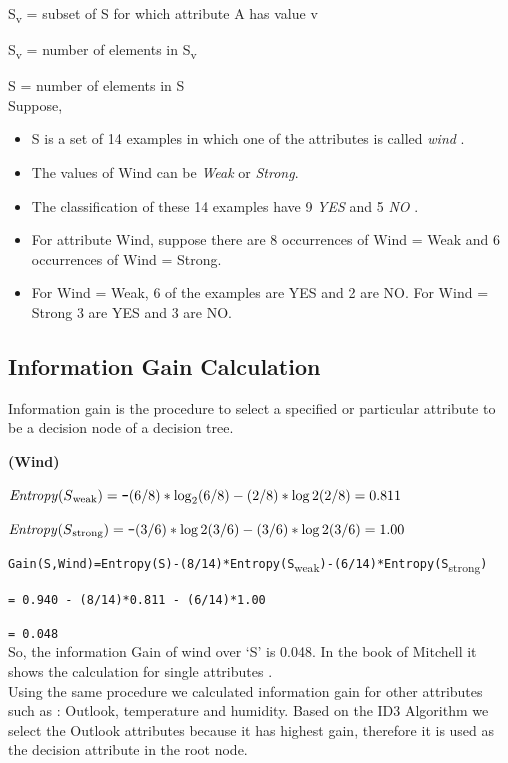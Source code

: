 \documentclass{report}
\newcommand\textstyleTeletype[1]{\texttt{#1}}
\begin{document}
S\textsubscript{v} = subset of S for which attribute A has value v

{\textbar}S\textsubscript{v}{\textbar} = number of elements in
S\textsubscript{v}

{\textbar}S{\textbar} = number of elements in S\\


Suppose,
\begin{itemize}

\item S is a set of 14 examples in which one of the attributes is called \emph{wind} .
\item The values of Wind can be \textit{Weak} or \textit{Strong}. 
\item The classification of these 14 examples have  9 \emph{YES} and 5 \emph{NO} . 
\item For attribute Wind, suppose there are 8 occurrences of Wind = Weak and 6 occurrences
of Wind = Strong. 
\item For Wind = Weak, 6 of the examples are YES and 2 are NO. For Wind = Strong 3 are YES and 3 are NO.\\ 
\end{itemize}
\pagebreak

\subsection{Information Gain Calculation}
\label{sec:inf}

Information gain is the procedure to select a specified or particular attribute to be a decision node of a decision tree.

{\bf (Wind)}

$\mathit{Entropy}(S\textsubscript{weak}) = \textstyleTeletype{{}-} (6/8)*\log_{2}(6/8)
{}- (2/8)*\log{2}(2/8) = 0.811$

$\mathit{Entropy}(S\textsubscript{strong}) = \textstyleTeletype{{}-}
(3/6)*\log{2}(3/6) {}- (3/6)*\log{2}(3/6) = 1.00$\\

{\centering
\textstyleTeletype{Gain(S,Wind)=Entropy(S){}-(8/14)*Entropy(S}\textsubscript{weak}\textstyleTeletype{){}-(6/14)*Entropy(S}\textsubscript{strong}\textstyleTeletype{)}
\par}

\textstyleTeletype{= 0.940 {}- (8/14)*0.811 {}- (6/14)*1.00}

\textstyleTeletype{= 0.048}\\

So, the information Gain of wind over `S' is 0.048. In the book of Mitchell it shows the calculation for single attributes \cite{Mitchell1997MachineLearning}.\\
Using the same procedure we calculated information gain for other attributes such as : Outlook, temperature and humidity.  Based on the ID3 Algorithm we select the Outlook attributes because it has highest gain, therefore it is used as the decision attribute in the root node.
\end{document}
